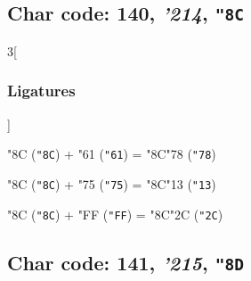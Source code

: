 \documentclass{article}
\newlength{\maxcharwidth}
\begin{document}
\subsection{Char code: 140, {\it'214}, {\tt"8C}}
\label{char_140}


\begin{multicols}{3}[\subsubsection{Ligatures}]

{\testfont\char"8C\noboundary} ({\tt"8C}) + {\testfont\char"61\noboundary} ({\tt"61}) = {\testfont\char"8C\noboundary}{\testfont\char"78\noboundary} ({\tt"78}) 

{\testfont\char"8C\noboundary} ({\tt"8C}) + {\testfont\char"75\noboundary} ({\tt"75}) = {\testfont\char"8C\noboundary}{\testfont\char"13\noboundary} ({\tt"13}) 

{\testfont\char"8C\noboundary} ({\tt"8C}) + {\testfont\char"FF\noboundary} ({\tt"FF}) = {\testfont\char"8C\noboundary}{\testfont\char"2C\noboundary} ({\tt"2C}) 

\end{multicols}

\subsection{Char code: 141, {\it'215}, {\tt"8D}}
\label{char_141}

\end{document}
